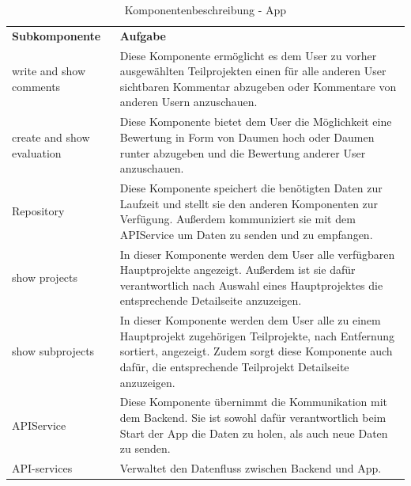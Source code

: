 \begin{table}[H]
	\centering
	\begin{tabularx}{\textwidth}{X X}
		\rowcolor[HTML]{C0C0C0} 
		\textbf{Subkomponente} & \textbf{Aufgabe} \\
		write and show comments & Diese Komponente ermöglicht es dem User zu vorher ausgewählten Teilprojekten einen für alle anderen User sichtbaren Kommentar abzugeben oder Kommentare von anderen Usern anzuschauen. \\
		\rowcolor[HTML]{E7E7E7}
		create and show evaluation & Diese Komponente bietet dem User die Möglichkeit eine Bewertung in Form von Daumen hoch oder Daumen runter abzugeben und die Bewertung anderer User anzuschauen.   \\
		 Repository &  Diese Komponente speichert die benötigten Daten zur Laufzeit und stellt sie den anderen Komponenten zur Verfügung. Außerdem kommuniziert sie mit dem APIService um Daten zu senden und zu empfangen. \\
		 \rowcolor[HTML]{E7E7E7}
		show projects & In dieser Komponente werden dem User alle verfügbaren Hauptprojekte angezeigt. Außerdem ist sie dafür verantwortlich nach Auswahl eines Hauptprojektes die entsprechende Detailseite anzuzeigen. \\
		show subprojects & In dieser Komponente werden dem User alle zu einem Hauptprojekt zugehörigen Teilprojekte,  nach Entfernung sortiert, angezeigt. Zudem sorgt diese Komponente auch dafür, die entsprechende Teilprojekt Detailseite anzuzeigen.   \\
		\rowcolor[HTML]{E7E7E7}
		APIService & Diese Komponente übernimmt die Kommunikation mit dem Backend. Sie ist sowohl dafür verantwortlich beim Start der App die Daten zu holen, als auch neue Daten zu senden. \\
		API-services & Verwaltet den Datenfluss zwischen Backend und App. \\
		
	\end{tabularx}
	\caption{Komponentenbeschreibung - App}
	\label{table:komponentenbeschreibung-app}
\end{table}